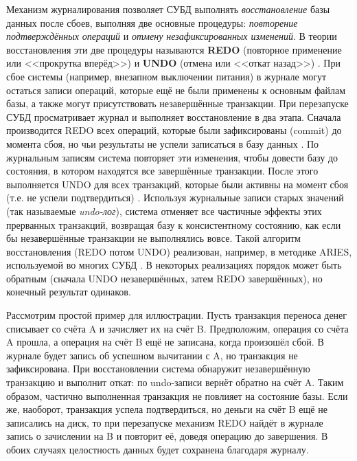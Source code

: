  Механизм журналирования позволяет СУБД выполнять \textit{восстановление} базы данных после сбоев, выполняя две основные процедуры: \textit{повторение подтверждённых операций} и \textit{отмену незафиксированных изменений}. В теории восстановления эти две процедуры называются \textbf{REDO} (повторное применение или <<прокрутка вперёд>>) и \textbf{UNDO} (отмена или <<откат назад>>) \autocite{ElmasriNavathe}. При сбое системы (например, внезапном выключении питания) в журнале могут остаться записи операций, которые ещё не были применены к основным файлам базы, а также могут присутствовать незавершённые транзакции. При перезапуске СУБД просматривает журнал и выполняет восстановление в два этапа. Сначала производится REDO всех операций, которые были зафиксированы (commit) до момента сбоя, но чьи результаты не успели записаться в базу данных \autocite{ElmasriNavathe}. По журнальным записям система повторяет эти изменения, чтобы довести базу до состояния, в котором находятся все завершённые транзакции. После этого выполняется UNDO для всех транзакций, которые были активны на момент сбоя (т.е. не успели подтвердиться) \autocite{ElmasriNavathe}. Используя журнальные записи старых значений (так называемые \textit{undo-лог}), система отменяет все частичные эффекты этих прерванных транзакций, возвращая базу к консистентному состоянию, как если бы незавершённые транзакции не выполнялись вовсе. Такой алгоритм восстановления (REDO потом UNDO) реализован, например, в методике ARIES, используемой во многих СУБД \autocite{Silberschatz}. В некоторых реализациях порядок может быть обратным (сначала UNDO незавершённых, затем REDO завершённых), но конечный результат одинаков. 
 
 Рассмотрим простой пример для иллюстрации. Пусть транзакция переноса денег списывает  со счёта A и зачисляет их на счёт B. Предположим, операция со счёта A прошла, а операция на счёт B ещё не записана, когда произошёл сбой. В журнале будет запись об успешном вычитании  с A, но транзакция не зафиксирована. При восстановлении система обнаружит незавершённую транзакцию и выполнит откат: по undo-записи вернёт  обратно на счёт A. Таким образом, частично выполненная транзакция не повлияет на состояние базы. Если же, наоборот, транзакция успела подтвердиться, но деньги на счёт B ещё не записались на диск, то при перезапуске механизм REDO найдёт в журнале запись о зачислении  на B и повторит её, доведя операцию до завершения. В обоих случаях целостность данных будет сохранена благодаря журналу. 
 

